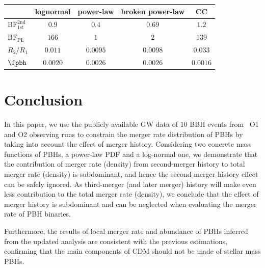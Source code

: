 \documentclass[
reprint,           %
superscriptaddress,%
amsmath,           %
amssymb,           %
aps,               %
prd,               %
notitlepage,       %
longbibliography,  %
floatfix,          %
showkeys,          %
]{revtex4-1}
\begin{document}
\begin{table}[tbp!]
	\centering
	\begin{tabular}{l|c|c|c|c}
		\hline\hline
		& lognormal & power-law & broken power-law & CC \\
		\hline
		$\mathrm{BF}^{\mathrm{2nd}}_{\mathrm{1st}}$ & $0.9$ & $0.4$ & $0.69$ & $1.2$ \\
		$\mathrm{BF}_{\mathrm{PL}}$ & $166$ & $1$ & $2$ & $139$ \\
		$R_2/R_1$ & $0.011$ & $0.0095$ & $0.0098$ & $0.033$ \\
		$\fpbh$ & $0.0020$ & $0.0026$ & $0.0026$ & $0.0016$ \\
		\hline
	\end{tabular}
\end{table}


\section{\label{conclusion}Conclusion}

In this paper, we use the publicly available GW data of $10$ BBH events from 
\lvc\ O1 and O2 observing runs to constrain the merger rate distribution 
of PBHs by taking into account the effect of merger history.
Considering two concrete mass functions of PBHs, a power-law PDF and 
a log-normal one, we demonstrate that the contribution of merger rate (density)
from second-merger history to total merger rate (density) is 
subdominant, and hence the second-merger history effect can be safely ignored.
As third-merger (and later merger) history will make even less contribution to 
the total merger rate (density), we conclude that the effect of merger history
is subdominant and can be neglected when evaluating the merger rate of PBH
binaries.

Furthermore, the results of local merger rate and abundance of PBHs inferred from the updated
analysis are consistent with the previous estimations, 
confirming that the main components of CDM should not be made of stellar 
mass PBHs. 
\end{document}
